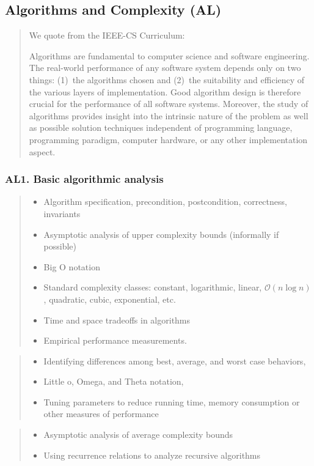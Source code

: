 \documentclass[a4paper,11pt,oneside]{article}
\newcommand{\cmark}{\ding{51}}%
\newcommand{\xmark}{\ding{55}}%
\newcommand{\CC}[1]{#1}
\newcommand{\cdef}{{\small\cmark\faFileTextO}}
\newcommand{\ccode}{{\small\cmark\faFileText}}
\newcommand{\cnfoc}{{\small\faQuestion}}
\newcommand{\cexcl}{{\small\xmark}}
\newcommand{\Idefine}{\item[\hbox to 1.8em{\cdef\hfill}]}
\newcommand{\Icodeonly}{\item[\hbox to 1.8em{\ccode\hfill}]}
\newcommand{\Inofocus}{\item[\hbox to 1.8em{\cnfoc\hfill}]}
\newcommand{\Iexcluded}{\item[\hbox to 1.8em{\cexcl\hfill}]}
\newenvironment{myitemize}{\begin{quote}\begin{itemize}\itemsep 0pt}{\end{itemize}\end{quote}}
\begin{document}

\subsection {Algorithms and Complexity (AL)}
\label{subsubsec:AL}

    \begin{quote}
    We quote from the IEEE-CS Curriculum:

    \sffamily\small
    Algorithms are fundamental to computer science and software engineering.
    The real-world performance of any software system depends only on two things:
    (1)~the algorithms chosen and
    (2)~the suitability and efficiency of the various layers of implementation.
    Good algorithm design is therefore crucial for the performance of all software systems.
    Moreover,
    the study of algorithms provides insight into the intrinsic nature of the problem
    as well as possible solution techniques independent of programming language,
    programming paradigm, computer hardware, or any other implementation aspect.
    \end{quote}

    \subsubsection*{AL1. Basic algorithmic analysis}%

    \begin{myitemize}
    \Idefine Algorithm specification, precondition, postcondition, correctness, invariants
    \Icodeonly\CC{Asymptotic analysis of upper complexity bounds} (informally if possible)
    \Icodeonly\CC{Big O notation}
    \Icodeonly\CC{Standard complexity classes}: constant, logarithmic, linear, $\mathcal{O}(n \log n)$, quadratic, cubic, exponential, etc.
    \Icodeonly\CC{Time and space tradeoffs in algorithms}
    \Icodeonly Empirical performance measurements.
    \end{myitemize}

    \begin{myitemize}
    \Inofocus \CC{Identifying differences among best, average, and worst case behaviors},
    \Inofocus \CC{Little o, Omega, and Theta notation},
    \Inofocus Tuning parameters to reduce running time, memory consumption or other measures of performance
    \end{myitemize}
  
    \begin{myitemize}
    \Iexcluded Asymptotic analysis of average complexity bounds
    \Iexcluded Using recurrence relations to analyze recursive algorithms
    \end{myitemize}
  
\end{document}
